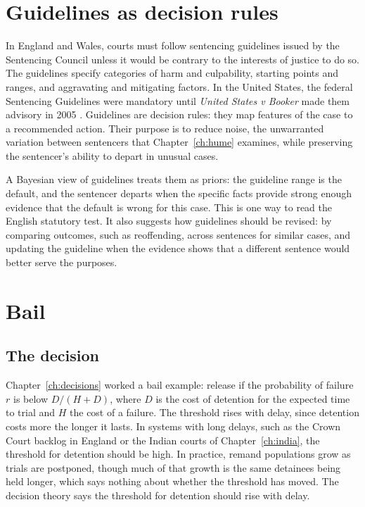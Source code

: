\section{Guidelines as decision rules}

In England and Wales, courts must follow sentencing guidelines issued by the Sentencing Council unless it would be contrary to the interests of justice to do so. The guidelines specify categories of harm and culpability, starting points and ranges, and aggravating and mitigating factors. In the United States, the federal Sentencing Guidelines were mandatory until \emph{United States v Booker} made them advisory in 2005 \citep{booker2005}. Guidelines are decision rules: they map features of the case to a recommended action. Their purpose is to reduce noise, the unwarranted variation between sentencers that Chapter~\ref{ch:hume} examines, while preserving the sentencer's ability to depart in unusual cases.

A Bayesian view of guidelines treats them as priors: the guideline range is the default, and the sentencer departs when the specific facts provide strong enough evidence that the default is wrong for this case. This is one way to read the English statutory test. It also suggests how guidelines should be revised: by comparing outcomes, such as reoffending, across sentences for similar cases, and updating the guideline when the evidence shows that a different sentence would better serve the purposes.

\section{Bail}

\subsection{The decision}

Chapter~\ref{ch:decisions} worked a bail example: release if the probability of failure $r$ is below $D/(H+D)$, where $D$ is the cost of detention for the expected time to trial and $H$ the cost of a failure. The threshold rises with delay, since detention costs more the longer it lasts. In systems with long delays, such as the Crown Court backlog in England or the Indian courts of Chapter~\ref{ch:india}, the threshold for detention should be high. In practice, remand populations grow as trials are postponed, though much of that growth is the same detainees being held longer, which says nothing about whether the threshold has moved. The decision theory says the threshold for detention should rise with delay.

